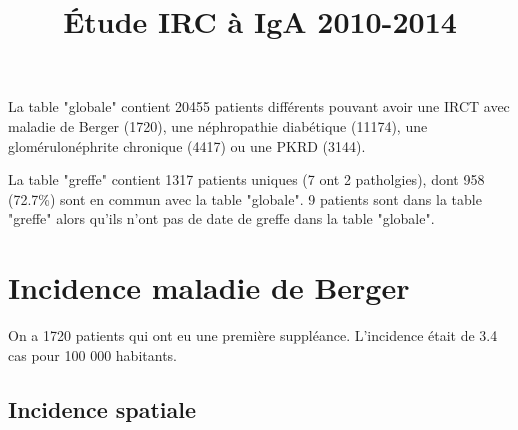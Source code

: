 \documentclass[11pt,a4paper]{article}\usepackage[]{graphicx}\usepackage[]{color}
\title{Étude IRC à IgA 2010-2014}
\begin{document}
\maketitle





La table "globale" contient 20455 patients différents pouvant avoir une IRCT avec maladie de Berger (1720), une néphropathie diabétique (11174), une glomérulonéphrite chronique (4417) ou une PKRD (3144).

La table "greffe" contient 1317 patients uniques (7 ont 2 patholgies), dont 958 (72.7\%) sont en commun avec la table "globale". 9 patients sont dans la table "greffe" alors qu'ils n'ont pas de date de greffe dans la table "globale".

\section{Incidence maladie de Berger}

On a 1720 patients qui ont eu une première suppléance. L'incidence était de 3.4 cas pour 100 000 habitants.

  \subsection{Incidence spatiale}
\end{document}
